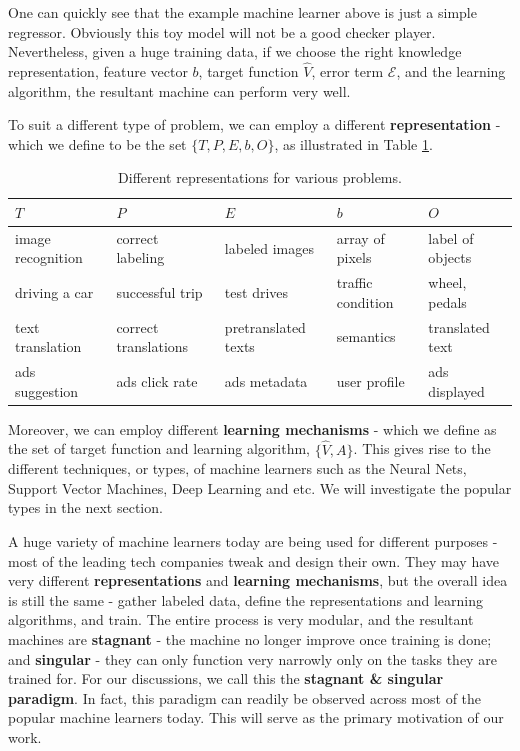 \documentclass[12pt]{article}  %
\begin{document}
One can quickly see that the example machine learner above is just a simple regressor. Obviously this toy model will not be a good checker player. Nevertheless, given a huge training data, if we choose the right knowledge representation, feature vector $b$, target function $\hat{V}$, error term $\mathcal{E}$, and the learning algorithm, the resultant machine can perform very well. 

To suit a different type of problem, we can employ a different {\bf representation} - which we define to be the set $\{T, P, E, b, O\}$, as illustrated in Table \ref{rep}.



\begin{table}[ht]
\begin{center}
\begin{tabular}{ | l | l | l || l | l | }

\hline
$T$ & $P$ & $E$ & $b$ & $O$ \\
\hline \hline
image recognition & correct labeling & labeled images & array of pixels & label of objects \\
\hline
driving a car & successful trip & test drives & traffic condition & wheel, pedals  \\
\hline
text translation & correct translations & pretranslated texts & semantics & translated text \\
\hline
ads suggestion & ads click rate & ads metadata & user profile & ads displayed \\
\hline
\end{tabular}
\caption{Different representations for various problems.}
\label{rep}
\end{center}
\end{table}



Moreover, we can employ different {\bf learning mechanisms} - which we define as the set of target function and learning algorithm, $\{\hat{V}, A\}$. This gives rise to the different techniques, or types, of machine learners such as the Neural Nets, Support Vector Machines, Deep Learning and etc. We will investigate the popular types in the next section.

A huge variety of machine learners today are being used for different purposes - most of the leading tech companies tweak and design their own. They may have very different {\bf representations} and {\bf learning mechanisms}, but the overall idea is still the same - gather labeled data, define the representations and learning algorithms, and train. The entire process is very modular, and the resultant machines are {\bf stagnant} - the machine no longer improve once training is done; and {\bf singular} - they can only function very narrowly only on the tasks they are trained for. For our discussions, we call this the {\bf stagnant \& singular paradigm}. In fact, this paradigm can readily be observed across most of the popular machine learners today. This will serve as the primary motivation of our work.
\end{document}
